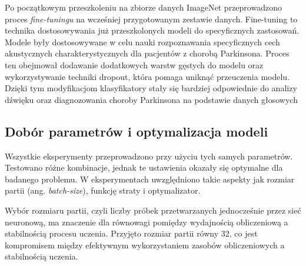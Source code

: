 Po początkowym przeszkoleniu na zbiorze danych ImageNet przeprowadzono proces \emph{fine-tuningu} na wcześniej przygotowanym zestawie danych.
Fine-tuning to technika dostosowywania już przeszkolonych modeli do specyficznych zastosowań.
Modele były dostosowywane w celu nauki rozpoznawania specyficznych cech akustycznych charakterystycznych dla pacjentów z chorobą Parkinsona.
Proces ten obejmował dodawanie dodatkowych warstw gęstych do modelu oraz wykorzystywanie techniki dropout, która pomaga uniknąć przeuczenia modelu.
Dzięki tym modyfikacjom klasyfikatory stały się bardziej odpowiednie do analizy dźwięku oraz diagnozowania choroby Parkinsona na podstawie danych głosowych



\subsection{Dobór parametrów i optymalizacja modeli}
\label{subsec:optymalizacja-modeli}

Wszystkie eksperymenty przeprowadzono przy użyciu tych samych parametrów.
Testowano różne kombinacje, jednak te ustawienia okazały się optymalne dla badanego problemu.
W eksperymentach uwzględniono takie aspekty jak rozmiar partii (ang. \emph{batch-size}), funkcję  straty i optymalizator.

Wybór rozmiaru partii, czyli liczby próbek przetwarzanych jednocześnie przez sieć neuronową, ma znaczenie dla równowagi pomiędzy wydajnością obliczeniową a stabilnością procesu  uczenia.
Przyjęto rozmiar partii równy 32, co jest kompromisem między efektywnym wykorzystaniem zasobów obliczeniowych a stabilnością uczenia.

